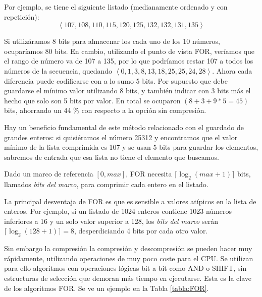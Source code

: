 Por ejemplo, se tiene el siguiente listado (medianamente ordenado y con repetición): 
\[\left< 107,108,110,115,120,125,132,132,131,135 \right> \]

Si utilizáramos 8 bits para almacenar los cada uno de los 10 números, ocuparíamos 80 bits. En cambio, utilizando el punto de vista FOR, veríamos que el rango de número va de 107 a 135, por lo que podríamos restar 107 a todos los números de la secuencia, quedando $\left< 0, 1, 3, 8, 13, 18, 25, 25, 24, 28 \right>$. Ahora cada diferencia puede codificarse con a lo sumo 5 bits. Por supuesto que debe guardarse el mínimo valor utilizando 8 bits, y también indicar con 3 bits más el hecho que solo son 5 bits por valor. En total se ocuparon $(8+3+9*5=45)$ bits, ahorrando un 44 \% con respecto a la opción sin compresión.

Hay un beneficio fundamental de este método relacionado con el guardado de grandes enteros: si quisiéramos el número 25312 y encontramos que el valor mínimo de la lista comprimida es 107 y se usan 5 bits para guardar los elementos, sabremos de entrada que esa lista no tiene el elemento que buscamos.

Dado un marco de referencia $[0, max]$, FOR necesita $\lceil \log_2(max+1) \rceil$ bits, llamados \textit{bits del marco}, para comprimir cada entero en el listado. 

La principal desventaja de FOR es que es sensible a valores atípicos en la lista de enteros. Por ejemplo, si un listado de 1024 enteros contiene 1023 números inferiores a 16 y un solo valor superior a 128, los \textit{bits del marco} serán $\lceil \log_2(128+1) \rceil = 8$, desperdiciando 4 bits por cada otro valor.

Sin embargo la compresión la compresión y descompresión se pueden hacer muy rápidamente, utilizando operaciones de muy poco coste para el CPU. Se utilizan para ello algoritmos con operaciones lógicas bit a bit como AND o SHIFT, sin estructuras de selección que demoran más tiempo en ejecutarse. Esta es la clave de los algoritmos FOR. Se ve un ejemplo en la Tabla \ref{tabla:FOR}.







